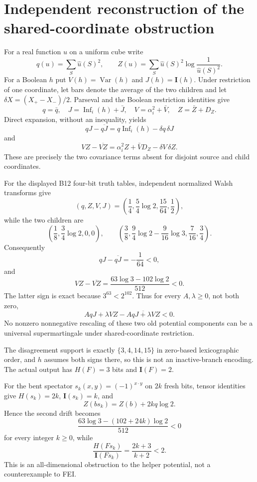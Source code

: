 \section*{Independent reconstruction of the shared-coordinate obstruction}

For a real function $u$ on a uniform cube write
\[
 q(u)=\sum_S\widehat u(S)^2,
 \qquad Z(u)=\sum_S\widehat u(S)^2\log\frac1{\widehat u(S)^2}.
\]
For a Boolean $h$ put $V(h)=\operatorname{Var}(h)$ and
$J(h)=\mathbf I(h)$.  Under restriction of one coordinate, let bars denote
the average of the two children and let $\delta X=(X_+-X_-)/2$.
Parseval and the Boolean restriction identities give
\[
 q=\bar q,\quad J=\operatorname{Inf}_i(h)+\bar J,
 \quad V=\alpha_i^2+\bar V,\quad Z=\bar Z+D_Z.
\]
Direct expansion, without an inequality, yields
\[
 qJ-\overline{qJ}=q\operatorname{Inf}_i(h)-\delta q\,\delta J
\]
and
\[
 VZ-\overline{VZ}=\alpha_i^2Z+\bar V D_Z-\delta V\,\delta Z.
\]
These are precisely the two covariance terms absent for disjoint source and
child coordinates.

For the displayed B12 four-bit truth tables, independent normalized Walsh
transforms give
\[
 (q,Z,V,J)=\left(\frac14,\frac54\log2,\frac{15}{64},\frac12\right),
\]
while the two children are
\[
 \left(\frac18,\frac34\log2,0,0\right),\qquad
 \left(\frac38,\frac94\log2-\frac9{16}\log3,
       \frac7{16},\frac34\right).
\]
Consequently
\[
 qJ-\overline{qJ}=-\frac1{64}<0,
\]
and
\[
 VZ-\overline{VZ}=\frac{63\log3-102\log2}{512}<0.
\]
The latter sign is exact because $3^{63}<2^{102}$.  Thus for every
$A,\lambda\ge0$, not both zero,
\[
 AqJ+\lambda VZ-
 \overline{AqJ+\lambda VZ}<0.
\]
No nonzero nonnegative rescaling of these two old potential components can
be a universal supermartingale under shared-coordinate restriction.

The disagreement support is exactly $\{3,4,14,15\}$ in zero-based
lexicographic order, and $h$ assumes both signs there, so this is not an
inactive-branch encoding.  The actual output has $H(F)=3$ bits and
$\mathbf I(F)=2$.

For the bent spectator $s_k(x,y)=(-1)^{x\cdot y}$ on $2k$ fresh bits,
tensor identities give $H(s_k)=2k$, $\mathbf I(s_k)=k$, and
\[
 Z(bs_k)=Z(b)+2kq\log2.
\]
Hence the second drift becomes
\[
 \frac{63\log3-(102+24k)\log2}{512}<0
\]
for every integer $k\ge0$, while
\[
 \frac{H(Fs_k)}{\mathbf I(Fs_k)}=\frac{2k+3}{k+2}<2.
\]
This is an all-dimensional obstruction to the helper potential, not a
counterexample to FEI.
